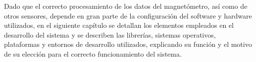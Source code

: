 Dado que el correcto procesamiento de los datos del magnetómetro, así como de otros sensores, depende en gran parte de la configuración del software y hardware utilizados, en el siguiente capítulo se detallan los elementos empleados en el desarrollo del sistema y se describen las librerías, sistemas operativos, plataformas y entornos de desarrollo utilizados, explicando su función y el motivo de su elección para el correcto funcionamiento del sistema.



\vspace{15cm} %







